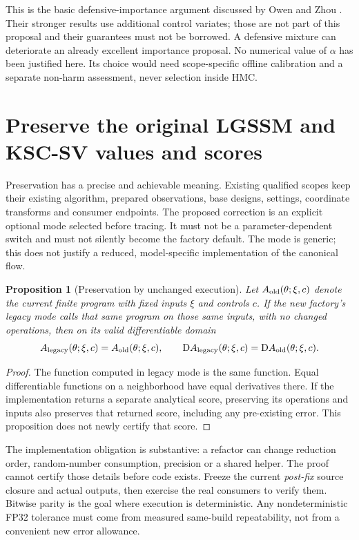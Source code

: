 \documentclass[11pt]{article}
\newtheorem{proposition}{Proposition}
\newcommand{\D}{\mathrm D}
\begin{document}
This is the basic defensive-importance argument discussed by
Owen and Zhou \cite[Sec.~3, especially Eq.~(10), and Sec.~3.1]{owen}.
Their stronger results use additional control variates; those are not
part of this proposal and their guarantees must not be borrowed.
A defensive mixture can deteriorate an already excellent importance
proposal. No numerical value of $\alpha$ has been justified here.
Its choice would need scope-specific offline calibration and a separate
non-harm assessment, never selection inside HMC.

\section{Preserve the original LGSSM and KSC-SV values and scores}

Preservation has a precise and achievable meaning. Existing qualified
scopes keep their existing algorithm, prepared observations, base designs,
settings, coordinate transforms and consumer endpoints. The proposed
correction is an explicit optional mode selected before tracing. It must
not be a parameter-dependent switch and must not silently become the
factory default. The mode is generic; this does not justify a reduced,
model-specific implementation of the canonical flow.

\begin{proposition}[Preservation by unchanged execution]
\label{prop:preserve}
Let $A_{\rm old}(\theta;\xi,c)$ denote the current finite program with fixed
inputs $\xi$ and controls $c$. If the new factory's legacy mode calls
that same program on those same inputs, with no changed operations,
then on its valid differentiable domain
\begin{equation}
 A_{\rm legacy}(\theta;\xi,c)=A_{\rm old}(\theta;\xi,c),\qquad
 \D A_{\rm legacy}(\theta;\xi,c)=\D A_{\rm old}(\theta;\xi,c).
 \label{eq:preserve}
\end{equation}
\end{proposition}
\begin{proof}
The function computed in legacy mode is the same function. Equal
differentiable functions on a neighborhood have equal derivatives there.
If the implementation returns a separate analytical score, preserving its
operations and inputs also preserves that returned score, including any
pre-existing error. This proposition does not newly certify that score.
\end{proof}

The implementation obligation is substantive: a refactor can change
reduction order, random-number consumption, precision or a shared helper.
The proof cannot certify those details before code exists. Freeze the
current \emph{post-fix} source closure and actual outputs, then exercise the
real consumers to verify them. Bitwise parity is the goal where execution
is deterministic. Any nondeterministic FP32 tolerance must come from
measured same-build repeatability, not from a convenient new error allowance.
\end{document}
